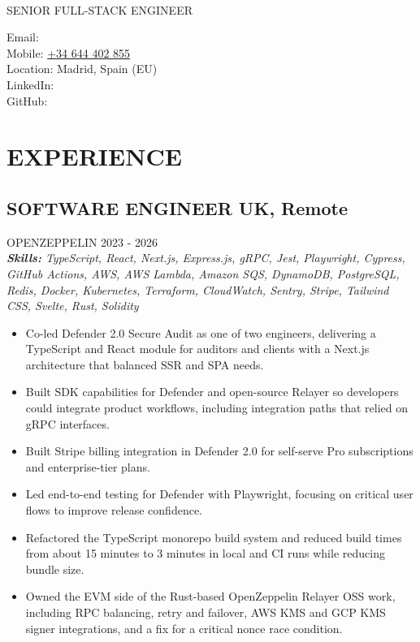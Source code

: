 \documentclass{article}
\newcommand{\WorkExperience}[2]{
   \subsection*{#1}
   \vspace{-1em}
   \uppercase{#2}
}
\newcommand{\Skills}[1]{
   \textit{\textbf{Skills:} #1}
}
\begin{document}
\begin{center}
	\begin{minipage}{0.5\textwidth}
		{\fontsize{24}{28}\Title{}} \\
		\bigskip
		{\normalsize \MakeUppercase{Senior Full-Stack Engineer}}
	\end{minipage} \hfill
	\begin{minipage}{0.4\textwidth}
		\raggedleft{}
		Email: \href{mailto:\ResumeEmail}{\ResumeEmail} \\
		Mobile: \href{tel:+34644402855}{+34 644 402 855}  \\
		Location: Madrid, Spain (EU) \\
		LinkedIn: \href{\ResumeLinkedInUrl}{\ResumeLinkedInLabel} \\
		GitHub: \href{\ResumeGitHubUrl}{\ResumeGitHubLabel}
	\end{minipage}
\end{center}

\vspace{-3em}

\phantom{Amazon, Microsoft, Facebook} %

\section*{EXPERIENCE}
\WorkExperience{SOFTWARE ENGINEER \hfill UK, Remote}{OpenZeppelin \hfill 2023 {-} 2026} \\
\Skills{TypeScript, React, Next.js, Express.js, gRPC, Jest, Playwright, Cypress, GitHub Actions, AWS, AWS Lambda, Amazon SQS, DynamoDB, PostgreSQL, Redis, Docker, Kubernetes, Terraform, CloudWatch, Sentry, Stripe, Tailwind CSS, Svelte, Rust, Solidity}
\begin{itemize}
\item Co-led Defender 2.0 Secure Audit as one of two engineers, delivering a TypeScript and React module for auditors and clients with a Next.js architecture that balanced SSR and SPA needs.
\item Built SDK capabilities for Defender and open-source Relayer so developers could integrate product workflows, including integration paths that relied on gRPC interfaces.
\item Built Stripe billing integration in Defender 2.0 for self-serve Pro subscriptions and enterprise-tier plans.
\item Led end-to-end testing for Defender with Playwright, focusing on critical user flows to improve release confidence.
\item Refactored the TypeScript monorepo build system and reduced build times from about 15 minutes to 3 minutes in local and CI runs while reducing bundle size.
\item Owned the EVM side of the Rust-based OpenZeppelin Relayer OSS work, including RPC balancing, retry and failover, AWS KMS and GCP KMS signer integrations, and a fix for a critical nonce race condition.
\end{itemize}
\end{document}
